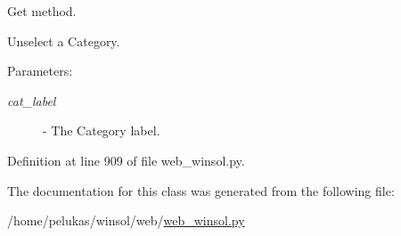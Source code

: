 Get method. 

Unselect a Category.

\begin{Desc}
\item[Parameters:]
\begin{description}
\item[{\em cat\_\-label}]- The Category label. \end{description}
\end{Desc}


Definition at line 909 of file web\_\-winsol.py.

The documentation for this class was generated from the following file:\begin{CompactItemize}
\item 
/home/pelukas/winsol/web/\hyperlink{web__winsol_8py}{web\_\-winsol.py}\end{CompactItemize}
